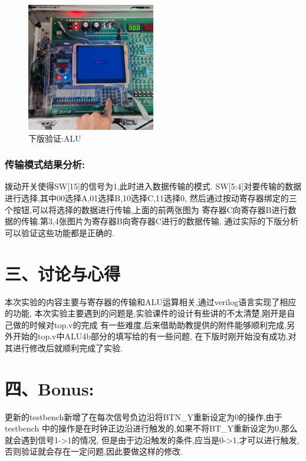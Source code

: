 \documentclass{article}
\begin{document}
    \begin{figure}[H]
        \centering
        \includegraphics[width=0.5\textwidth]{13.jpg}
        \caption{\label{Lab11}下版验证:ALU}
        \end{figure}

\subsubsection*{传输模式结果分析:}
拨动开关使得SW[15]的信号为1,此时进入数据传输的模式.
SW[5:4]对要传输的数据进行选择,其中00选择A,01选择B,10选择C,11选择0,
然后通过按动寄存器绑定的三个按钮,可以将选择的数据进行传输,上面的前两张图为
寄存器C向寄存器B进行数据的传输.第3,4张图片为寄存器B向寄存器C进行的数据传输,
通过实际的下版分析可以验证这些功能都是正确的.



\section*{三、讨论与心得}
本次实验的内容主要与寄存器的传输和ALU运算相关,通过verilog语言实现了相应的功能,
本次实验主要遇到的问题是,实验课件的设计有些讲的不太清楚,刚开是自己做的时候对top.v的完成
有一些难度,后来借助助教提供的附件能够顺利完成,另外开始的top.v中ALU4b部分的填写给的有一些问题,
在下版时刚开始没有成功,对其进行修改后就顺利完成了实验.

\section*{四、Bonus:}
更新的testbench新增了在每次信号负边沿将BTN\_Y重新设定为0的操作,由于testbench
中的操作是在时钟正边沿进行触发的,如果不将BT\_Y重新设定为0,那么就会遇到信号1->1的情况,
但是由于边沿触发的条件,应当是0->1,才可以进行触发,否则验证就会存在一定问题,因此要做这样的修改.
\end{document}

